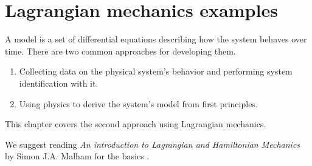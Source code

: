 
\chapter{Lagrangian mechanics examples}

A \gls{model} is a set of differential equations describing how the \gls{system}
behaves over time. There are two common approaches for developing them.
\begin{enumerate}
  \item Collecting data on the physical system's behavior and performing
    \gls{system} identification with it.
  \item Using physics to derive the \gls{system}'s model from first principles.
\end{enumerate}

This chapter covers the second approach using Lagrangian mechanics.

We suggest reading \textit{An introduction to Lagrangian and Hamiltonian
Mechanics} by Simon J.A. Malham for the basics
\cite{bib:an_intro_to_lagrangian_and_hamiltonian_mechanics}.

\renewcommand*{\chapterpath}{\partpath/lagrangian-mechanics-examples}


